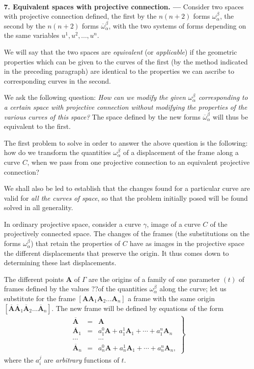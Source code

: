 
\ \\

{\bf 7. Equivalent spaces with projective connection. --- }
% 
Consider two spaces with projective connection defined, the first by the $n (n + 2)$ forms $\omega^\beta_\alpha$, the second by the $n (n +2)$ forms $\overline \omega^\beta_\alpha$, with the two systems of forms depending on the same variables $u^1, u^2, ..., u^n$. 

We will say that the two spaces are {\em equivalent} (or {\em applicable}) if the geometric properties which can be given to the curves of the first (by the method indicated in the preceding paragraph) are identical to the properties we can ascribe to corresponding curves in the second.

We ask the following question: {\em How can we modify the given $\omega^\beta_\alpha$ corresponding to a certain space with projective connection without modifying the properties of the various  curves of this space?} The space defined by the new forms $\overline \omega^\beta_\alpha$ will thus be equivalent to the first.

The first problem to solve in order to answer the above question is the following: how do we transform the quantities $\omega^\beta_\alpha$ of a displacement of the frame along a curve $C$, when we pass from one projective connection to an equivalent  projective connection?

We shall also be led to establish that the changes found for a particular curve are valid for {\em all the curves of space}, so that the problem initially posed will be found solved in all generality.

In ordinary projective space, consider a curve $\gamma$, image of a curve $C$ of the projectively connected space. The changes of the frames (the substitutions on the forms $\omega^\beta_\alpha$) that retain the properties of $C$ have as images in the projective space the different displacements that preserve the origin. It thus comes down to determining these last displacements.

The different points $\bm A$ of $\Gamma$ are the origins of a family of one parameter $(t)$ of frames defined by the values ??of the quantities $\omega^\beta_\alpha$ along the curve; let us substitute for the frame $[\bm A \bm A_1 \bm A_2 ... \bm A_n]$ a frame with the same origin $[\overline{\bm A} \overline{\bm A}_1 \overline{\bm A}_2 ... \overline{\bm A}_n]$. The new frame will be defined by equations of the form
\begin{eqnarray}
\left.
\begin{array}{lll}
\overline{\bm A}  & =  & \bm A  \\
\overline{\bm A}_1  & =  & a^0_1\bm A + a^1_1 \bm A_1 + \cdots + a^n_1 \bm A_n \\
 \cdots &   & \cdots  \\
\overline{\bm A}_n  & =  & a^0_n\bm A + a^1_n \bm A_1 + \cdots + a^n_n \bm A_n   , 
\end{array}
\right\}
\label{eq:1-6}
\end{eqnarray}
where the $a^j_i$ are {\em arbitrary} functions of $t$.

